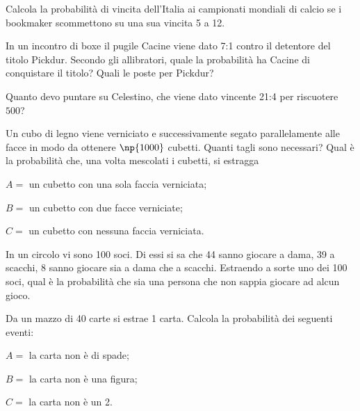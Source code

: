 \begin{esercizio}[\Ast]
 \label{ese:9.39}
Calcola la probabilità di vincita dell'Italia ai campionati mondiali di calcio se i bookmaker scommettono su una sua vincita 5 a 12.
\end{esercizio}

\begin{esercizio}[\Ast]
 \label{ese:9.40}
In un incontro di boxe il pugile Cacine viene dato 7:1 contro il detentore del titolo Pickdur.
Secondo gli allibratori, quale la probabilità ha Cacine di conquistare il titolo?
Quali le poste per Pickdur?
\end{esercizio}

\begin{esercizio}[\Ast]
 \label{ese:9.41}
Quanto devo puntare su Celestino, che viene dato vincente 21:4 per riscuotere \officialeuro~$500$?
\end{esercizio}

\begin{esercizio}[\Ast]
 \label{ese:9.42}
Un cubo di legno viene verniciato e successivamente segato parallelamente alle facce in modo da ottenere $\np{1000}$ cubetti. Quanti tagli sono necessari? Qual è la probabilità che, una volta mescolati i cubetti, si estragga
\begin{description*}
\item $ A= $ un cubetto con una sola faccia verniciata;
\item $ B= $ un cubetto con due facce verniciate;
\item $ C= $ un cubetto con nessuna faccia verniciata.
\end{description*}
\end{esercizio}

\begin{esercizio}[\Ast]
 \label{ese:9.43}
In un circolo vi sono 100 soci. Di essi si sa che 44 sanno giocare a dama, 39 a scacchi, 8 sanno giocare sia a dama che a scacchi. Estraendo a sorte uno dei 100 soci, qual è la probabilità che sia una persona che non sappia giocare ad alcun gioco.
\end{esercizio}

\begin{esercizio}[\Ast]
 \label{ese:9.44}
Da un mazzo di 40 carte si estrae 1 carta. Calcola la probabilità dei seguenti eventi:
\begin{description*}
\item $ A= $ la carta non è di spade;
\item $ B= $ la carta non è una figura;
\item $ C= $ la carta non è un 2.
\end{description*}
\end{esercizio}

